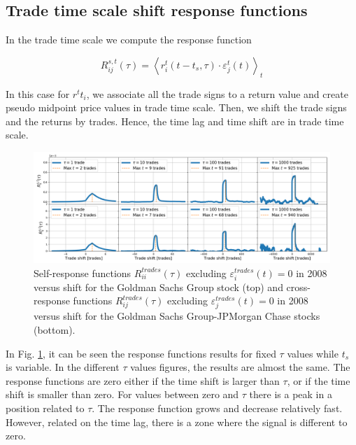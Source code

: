 \subsection{Trade time scale shift response functions}
\label{subsec:time_shift_trade}

In the trade time scale we compute the response function

\begin{equation}\label{eq:time_shift_trade}
    R_{ij}^{s, t}\left(\tau\right)=\left\langle r^{t}_{i}
    \left(t-t_{s},\tau\right) \cdot\varepsilon^{t}_{j}
    \left(t\right)\right\rangle _{t}
\end{equation}

In this case for $r^t{t}_{i}$, we associate all the trade signs to a return
value and create pseudo midpoint price values in trade time scale. Then, we shift
the trade signs and the returns by trades. Hence, the
time lag and time shift are in trade time scale.

\begin{figure}[htbp]
    \centering
    \includegraphics[width=\textwidth]{figures/04_shift_trade_RIG_APA.png}
    \caption{Self-response functions $R_{ii}^{trades}\left(\tau\right)$
             excluding $\varepsilon^{trades}_{i}\left(t\right) = 0$ in 2008
             versus shift for the Goldman Sachs Group stock (top) and
             cross-response functions $R_{ij}^{trades}\left(\tau\right)$
             excluding $\varepsilon^{trades}_{j}\left(t\right) = 0$ in 2008
             versus shift for the Goldman Sachs Group-JPMorgan Chase stocks
             (bottom).}
    \label{fig:shift_trade_scale}
\end{figure}

In Fig. \ref{fig:shift_trade_scale}, it can be seen the response functions results
for fixed $\tau$ values while $t_{s}$ is variable. In the different $\tau$ values
figures, the results are almost the same. The response functions are zero either if the
time shift is larger than $\tau$, or if the time shift is smaller than zero.
For values between zero and $\tau$ there is a peak in a position related to $\tau$.
The response function grows and decrease relatively fast. However, related on the
time lag, there is a zone where the signal is different to zero.

